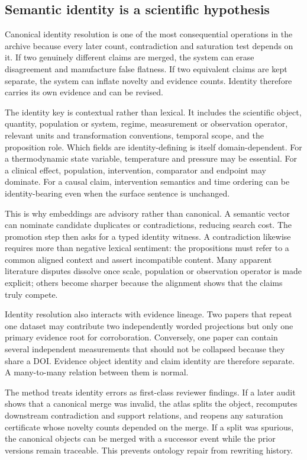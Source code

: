 \subsection{Semantic identity is a scientific hypothesis}

Canonical identity resolution is one of the most consequential operations in the archive because every later count, contradiction and saturation test depends on it. If two genuinely different claims are merged, the system can erase disagreement and manufacture false flatness. If two equivalent claims are kept separate, the system can inflate novelty and evidence counts. Identity therefore carries its own evidence and can be revised.

The identity key is contextual rather than lexical. It includes the scientific object, quantity, population or system, regime, measurement or observation operator, relevant units and transformation conventions, temporal scope, and the proposition role. Which fields are identity-defining is itself domain-dependent. For a thermodynamic state variable, temperature and pressure may be essential. For a clinical effect, population, intervention, comparator and endpoint may dominate. For a causal claim, intervention semantics and time ordering can be identity-bearing even when the surface sentence is unchanged.

This is why embeddings are advisory rather than canonical. A semantic vector can nominate candidate duplicates or contradictions, reducing search cost. The promotion step then asks for a typed identity witness. A contradiction likewise requires more than negative lexical sentiment: the propositions must refer to a common aligned context and assert incompatible content. Many apparent literature disputes dissolve once scale, population or observation operator is made explicit; others become sharper because the alignment shows that the claims truly compete.

Identity resolution also interacts with evidence lineage. Two papers that repeat one dataset may contribute two independently worded projections but only one primary evidence root for corroboration. Conversely, one paper can contain several independent measurements that should not be collapsed because they share a DOI. Evidence object identity and claim identity are therefore separate. A many-to-many relation between them is normal.

The method treats identity errors as first-class reviewer findings. If a later audit shows that a canonical merge was invalid, the atlas splits the object, recomputes downstream contradiction and support relations, and reopens any saturation certificate whose novelty counts depended on the merge. If a split was spurious, the canonical objects can be merged with a successor event while the prior versions remain traceable. This prevents ontology repair from rewriting history.

